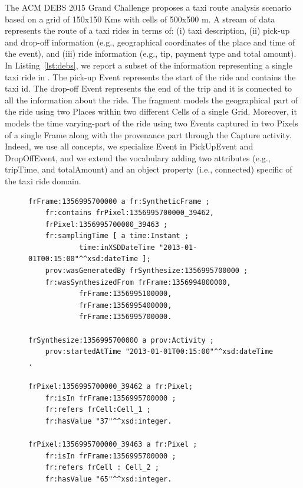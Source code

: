 The ACM DEBS 2015 Grand Challenge proposes a taxi route analysis scenario based on a grid of 150x150 Kms with cells of 500x500 m. A stream of data represents the route of a taxi rides in terms of: (i) taxi description, (ii) pick-up and drop-off information (e.g., geographical coordinates of the place and time of the event), and (iii) ride information (e.g., tip, payment type and total amount).
In Listing~\ref{lst:debs}, we report a subset of the information representing a single taxi ride in \frappe{}. The pick-up \textsf{Event} represents the start of the ride and contains the taxi id. The drop-off \textsf{Event} represents the end of the trip and it is connected to all the information about the ride. The fragment models the geographical part of the ride using two \textsf{Place}s within two different \textsf{Cell}s of a single \textsf{Grid}. Moreover, it models the time varying-part of the ride using two \textsf{Event}s captured in two \textsf{Pixel}s of a single \textsf{Frame} along with the provenance part through the \textsf{Capture} activity. Indeed, we use all \frappe{} concepts, we specialize \textsf{Event} in \textsf{PickUpEvent} and \textsf{DropOffEvent}, and we extend the vocabulary adding two attributes (e.g., \textsf{tripTime}, and \textsf{totalAmount}) and an object property (i.e., \textsf{connected}) specific of the taxi ride domain.

\begin{figure}[t]
\begin{minipage}{0.95\linewidth}
\begin{lstlisting}[label={lst:synthetic-debs}, caption={Fragment of the model that represents a \textsc{SytheticFrame}}, style=N3]
frFrame:1356995700000 a fr:SyntheticFrame ;
    fr:contains frPixel:1356995700000_39462, 
    frPixel:1356995700000_39463 ;
    fr:samplingTime [ a time:Instant ; 
    		time:inXSDDateTime "2013-01-01T00:15:00"^^xsd:dateTime ];
    prov:wasGeneratedBy frSynthesize:1356995700000 ;
    fr:wasSynthesizedFrom frFrame:1356994800000, 
    		frFrame:1356995100000, 
            frFrame:1356995400000, 
            frFrame:1356995700000. 

frSynthesize:1356995700000 a prov:Activity ;
	prov:startedAtTime "2013-01-01T00:15:00"^^xsd:dateTime .

frPixel:1356995700000_39462 a fr:Pixel;
    fr:isIn frFrame:1356995700000 ;
    fr:refers frCell:Cell_1 ;
    fr:hasValue "37"^^xsd:integer.

frPixel:1356995700000_39463 a fr:Pixel ;
    fr:isIn frFrame:1356995700000 ;
    fr:refers frCell : Cell_2 ;
    fr:hasValue "65"^^xsd:integer.
\end{lstlisting}
\end{minipage}
\end{figure} 

